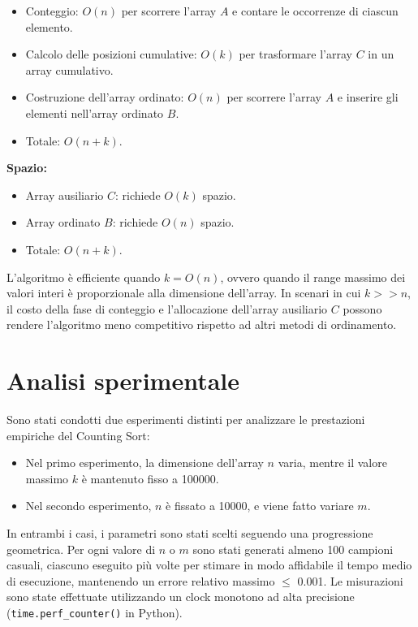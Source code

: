 \documentclass[a4paper, 12pt, oneside]{book}
\begin{document}
\begin{itemize}
    \item Conteggio: \(O(n)\) per scorrere l'array \(A\) e contare le occorrenze di ciascun elemento.
    \item Calcolo delle posizioni cumulative: \(O(k)\) per trasformare l'array \(C\) in un array cumulativo.
    \item Costruzione dell'array ordinato: \(O(n)\) per scorrere l'array \(A\) e inserire gli elementi nell'array ordinato \(B\).
    \item Totale: \(O(n + k)\).
\end{itemize}

\noindent \textbf{Spazio:}

\begin{itemize}
    \item Array ausiliario \(C\): richiede \(O(k)\) spazio.
    \item Array ordinato \(B\): richiede \(O(n)\) spazio.
    \item Totale: \(O(n + k)\).
\end{itemize}

\noindent L'algoritmo è efficiente quando \(k = O(n)\), ovvero quando il range massimo dei valori interi è proporzionale alla dimensione dell'array.
In scenari in cui \(k >> n\), il costo della fase di conteggio e l'allocazione dell'array ausiliario \(C\) possono rendere l'algoritmo meno competitivo rispetto ad altri metodi di ordinamento.

\section{Analisi sperimentale}

Sono stati condotti due esperimenti distinti per analizzare le prestazioni empiriche del Counting Sort:

\begin{itemize}
    \item Nel primo esperimento, la dimensione dell'array \(n\) varia, mentre il valore massimo \(k\) è mantenuto fisso a 100000.
    \item Nel secondo esperimento, \(n\) è fissato a 10000, e viene fatto variare \(m\).
\end{itemize}

\noindent In entrambi i casi, i parametri sono stati scelti seguendo una progressione geometrica.
Per ogni valore di \(n\) o \(m\) sono stati generati almeno 100 campioni casuali, ciascuno eseguito più volte per stimare in modo affidabile il tempo medio di esecuzione, mantenendo un errore relativo massimo \(\leq\) 0.001.
Le misurazioni sono state effettuate utilizzando un clock monotono ad alta precisione (\texttt{time.perf\_counter()} in Python). \\
\end{document}
